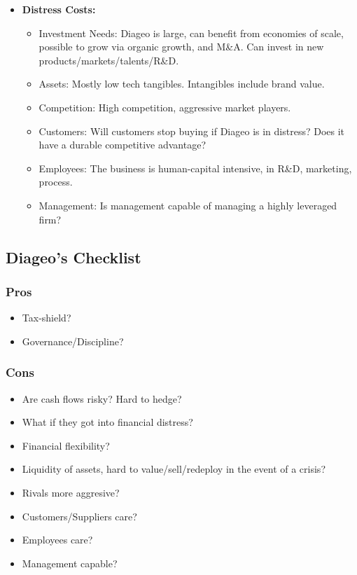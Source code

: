\begin{itemize}
\begin{itemize}
    \end{itemize}
    \item \textbf{Distress Costs:}
    \begin{itemize}
        \item Investment Needs: Diageo is large, can benefit from economies of scale, possible to grow via organic growth, and M\&A. Can invest in new products/markets/talents/R\&D.
        \item Assets: Mostly low tech tangibles. Intangibles include brand value. 
        \item Competition: High competition, aggressive market players. 
        \item Customers: Will customers stop buying if Diageo is in distress? Does it have a durable competitive advantage?
        \item Employees: The business is human-capital intensive, in R\&D, marketing, process.
        \item Management: Is management capable of managing a highly leveraged firm?
    \end{itemize}
\end{itemize}

\subsection*{Diageo's Checklist}
\subsubsection*{Pros}
\begin{itemize}
    \item Tax-shield?
    \item Governance/Discipline?
\end{itemize}
\subsubsection*{Cons}
\begin{itemize}
    \item Are cash flows risky? Hard to hedge?
    \item What if they got into financial distress?
    \item Financial flexibility?
    \item Liquidity of assets, hard to value/sell/redeploy in the event of a crisis?
    \item Rivals more aggresive?
    \item Customers/Suppliers care?
    \item Employees care?
    \item Management capable?
\end{itemize}

